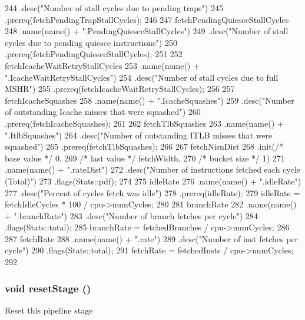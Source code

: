 \begin{DoxyCode}
{244         .desc("Number of stall cycles due to pending traps")
245         .prereq(fetchPendingTrapStallCycles);
246 
247     fetchPendingQuiesceStallCycles
248         .name(name() + ".PendingQuiesceStallCycles")
249         .desc("Number of stall cycles due to pending quiesce instructions")
250         .prereq(fetchPendingQuiesceStallCycles);
251 
252     fetchIcacheWaitRetryStallCycles
253         .name(name() + ".IcacheWaitRetryStallCycles")
254         .desc("Number of stall cycles due to full MSHR")
255         .prereq(fetchIcacheWaitRetryStallCycles);
256 
257     fetchIcacheSquashes
258         .name(name() + ".IcacheSquashes")
259         .desc("Number of outstanding Icache misses that were squashed")
260         .prereq(fetchIcacheSquashes);
261 
262     fetchTlbSquashes
263         .name(name() + ".ItlbSquashes")
264         .desc("Number of outstanding ITLB misses that were squashed")
265         .prereq(fetchTlbSquashes);
266 
267     fetchNisnDist
268         .init(/* base value */ 0,
269               /* last value */ fetchWidth,
270               /* bucket size */ 1)
271         .name(name() + ".rateDist")
272         .desc("Number of instructions fetched each cycle (Total)")
273         .flags(Stats::pdf);
274 
275     idleRate
276         .name(name() + ".idleRate")
277         .desc("Percent of cycles fetch was idle")
278         .prereq(idleRate);
279     idleRate = fetchIdleCycles * 100 / cpu->numCycles;
280 
281     branchRate
282         .name(name() + ".branchRate")
283         .desc("Number of branch fetches per cycle")
284         .flags(Stats::total);
285     branchRate = fetchedBranches / cpu->numCycles;
286 
287     fetchRate
288         .name(name() + ".rate")
289         .desc("Number of inst fetches per cycle")
290         .flags(Stats::total);
291     fetchRate = fetchedInsts / cpu->numCycles;
292 }
\end{DoxyCode}
\hypertarget{classDefaultFetch_ada2a699094bc420f977abf2a17ed14c8}{
\subsubsection[{resetStage}]{\setlength{\rightskip}{0pt plus 5cm}void resetStage ()}}
\label{classDefaultFetch_ada2a699094bc420f977abf2a17ed14c8}
Reset this pipeline stage 


